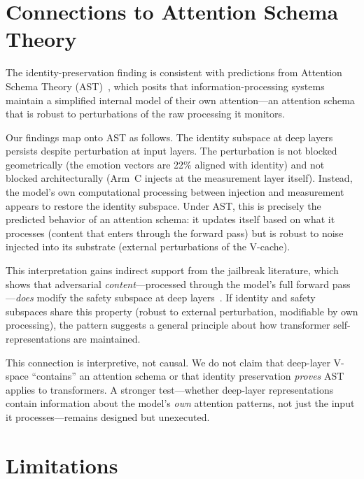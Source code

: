 \documentclass[11pt,a4paper]{article}
\begin{document}
\section{Connections to Attention Schema Theory}
\label{sec:ast}

The identity-preservation finding is consistent with predictions from
Attention Schema Theory
(AST)~\citep{graziano2015attention,graziano2017attention}, which posits that
information-processing systems maintain a simplified internal model of their
own attention---an attention schema that is robust to perturbations of the
raw processing it monitors.

Our findings map onto AST as follows. The identity subspace at deep layers
persists despite perturbation at input layers. The perturbation is not
blocked geometrically (the emotion vectors are 22\% aligned with identity)
and not blocked architecturally (Arm~C injects at the measurement layer
itself). Instead, the model's own computational processing between injection
and measurement appears to restore the identity subspace. Under AST, this
is precisely the predicted behavior of an attention schema: it updates
itself based on what it processes (content that enters through the forward
pass) but is robust to noise injected into its substrate (external
perturbations of the V-cache).

This interpretation gains indirect support from the jailbreak literature,
which shows that adversarial \emph{content}---processed through the model's
full forward pass---\emph{does} modify the safety subspace at deep
layers~\citep{arditi2024refusal}. If identity and safety subspaces share
this property (robust to external perturbation, modifiable by own
processing), the pattern suggests a general principle about how transformer
self-representations are maintained.

This connection is interpretive, not causal. We do not claim that deep-layer
V-space ``contains'' an attention schema or that identity preservation
\emph{proves} AST applies to transformers. A stronger test---whether
deep-layer representations contain information about the model's \emph{own}
attention patterns, not just the input it processes---remains designed but
unexecuted.

\section{Limitations}
\label{sec:limitations}
\end{document}
